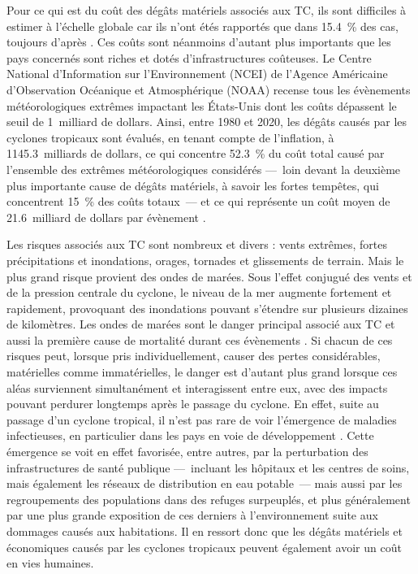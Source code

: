 \documentclass[../main.tex]{subfiles}
\begin{document}
Pour ce qui est du coût des dégâts matériels associés aux TC, ils sont difficiles à estimer à l'échelle globale car ils n'ont étés rapportés que dans
\SI{15.4}{\percent} des cas, toujours d'après \textcite{doocy_human_2013}. Ces coûts sont néanmoins d'autant plus importants que les pays concernés sont riches et
dotés d'infrastructures coûteuses. Le Centre National d'Information sur l'Environnement (NCEI) de l'Agence Américaine d'Observation Océanique et Atmosphérique
(NOAA) recense tous les évènements météorologiques extrêmes impactant les États-Unis dont les coûts dépassent le seuil de \num{1}~milliard de dollars. Ainsi,
entre 1980 et 2020, les dégâts causés par les cyclones tropicaux sont évalués, en tenant compte de l'inflation, à \num{1145.3}~milliards de dollars, ce qui
concentre \SI{52.3}{\percent} du coût total causé par l'ensemble des extrêmes météorologiques considérés ---~loin devant la deuxième plus importante cause de
dégâts matériels, à savoir les fortes tempêtes, qui concentrent \SI{15}{\percent} des coûts totaux~--- et ce qui représente un coût moyen de \num{21.6}~milliard
de dollars par évènement \parencite{smith_billiondollar_2020}.

Les risques associés aux TC sont nombreux et divers : vents extrêmes, fortes précipitations et inondations, orages, tornades et glissements de terrain. Mais le
plus grand risque provient des ondes de marées. Sous l'effet conjugué des vents et de la pression centrale du cyclone, le niveau de la mer augmente fortement et
rapidement, provoquant des inondations pouvant s'étendre sur plusieurs dizaines de kilomètres. Les ondes de marées sont le danger principal associé aux TC et
aussi la première cause de mortalité durant ces évènements \parencite{needham_review_2015}. Si chacun de ces risques peut, lorsque pris individuellement, causer
des pertes considérables, matérielles comme immatérielles, le danger est d'autant plus grand lorsque ces aléas surviennent simultanément et interagissent entre
eux, avec des impacts pouvant perdurer longtemps après le passage du cyclone. En effet, suite au passage d'un cyclone tropical, il n'est pas rare de voir
l'émergence de maladies infectieuses, en particulier dans les pays en voie de développement \parencite{shultz_epidemiology_2005}. Cette émergence se voit en
effet favorisée, entre autres, par la perturbation des infrastructures de santé publique ---~incluant les hôpitaux et les centres de soins, mais également les
réseaux de distribution en eau potable~--- mais aussi par les regroupements des populations dans des refuges surpeuplés, et plus généralement par une plus
grande exposition de ces derniers à l'environnement suite aux dommages causés aux habitations. Il en ressort donc que les dégâts matériels et économiques causés
par les cyclones tropicaux peuvent également avoir un coût en vies humaines.
\end{document}
